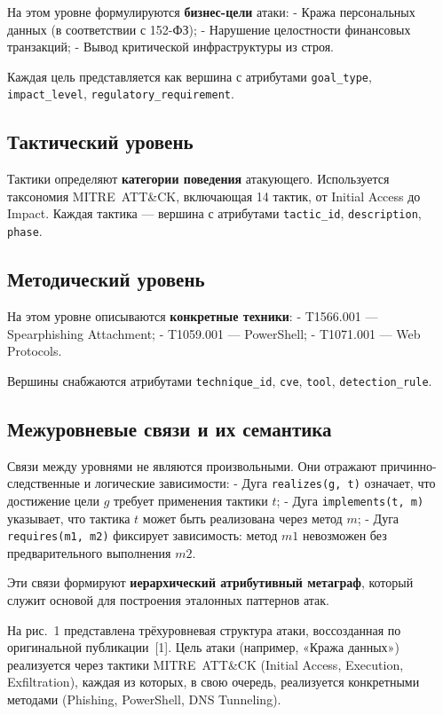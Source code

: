 \documentclass[12pt,a4paper]{extarticle}
\begin{document}
На этом уровне формулируются \textbf{бизнес-цели} атаки:
- Кража персональных данных (в соответствии с 152-ФЗ);
- Нарушение целостности финансовых транзакций;
- Вывод критической инфраструктуры из строя.

Каждая цель представляется как вершина с атрибутами \texttt{goal\_type}, \texttt{impact\_level}, \texttt{regulatory\_requirement}.

\subsection{Тактический уровень}

Тактики определяют \textbf{категории поведения} атакующего. Используется таксономия MITRE~ATT\&CK, включающая 14 тактик, от Initial Access до Impact. Каждая тактика — вершина с атрибутами \texttt{tactic\_id}, \texttt{description}, \texttt{phase}.

\subsection{Методический уровень}

На этом уровне описываются \textbf{конкретные техники}:
- T1566.001 — Spearphishing Attachment;
- T1059.001 — PowerShell;
- T1071.001 — Web Protocols.

Вершины снабжаются атрибутами \texttt{technique\_id}, \texttt{cve}, \texttt{tool}, \texttt{detection\_rule}.

\subsection{Межуровневые связи и их семантика}

Связи между уровнями не являются произвольными. Они отражают причинно-следственные и логические зависимости:
- Дуга \texttt{realizes(g, t)} означает, что достижение цели \(g\) требует применения тактики \(t\);
- Дуга \texttt{implements(t, m)} указывает, что тактика \(t\) может быть реализована через метод \(m\);
- Дуга \texttt{requires(m1, m2)} фиксирует зависимость: метод \(m1\) невозможен без предварительного выполнения \(m2\).

Эти связи формируют \textbf{иерархический атрибутивный метаграф}, который служит основой для построения эталонных паттернов атак.

На рис.~1 представлена трёхуровневая структура атаки, воссозданная по оригинальной публикации~[1]. Цель атаки (например, «Кража данных») реализуется через тактики MITRE~ATT\&CK (Initial Access, Execution, Exfiltration), каждая из которых, в свою очередь, реализуется конкретными методами (Phishing, PowerShell, DNS Tunneling).
\end{document}
